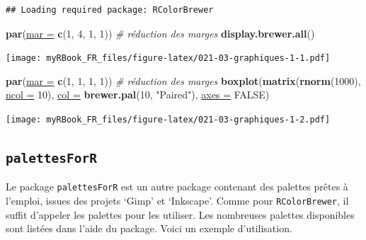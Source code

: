 \documentclass[twoside,symmetric]{book}
\newenvironment{Shaded}{}{}
\newcommand{\CommentTok}[1]{\textit{#1}}
\newcommand{\DataTypeTok}[1]{\underline{#1}}
\newcommand{\DecValTok}[1]{#1}
\newcommand{\KeywordTok}[1]{\textbf{#1}}
\newcommand{\NormalTok}[1]{#1}
\newcommand{\OtherTok}[1]{#1}
\newcommand{\StringTok}[1]{#1}
\begin{document}
\begin{verbatim}
## Loading required package: RColorBrewer
\end{verbatim}

\begin{Shaded}
\begin{Highlighting}[]
\KeywordTok{par}\NormalTok{(}\DataTypeTok{mar =} \KeywordTok{c}\NormalTok{(}\DecValTok{1}\NormalTok{, }\DecValTok{4}\NormalTok{, }\DecValTok{1}\NormalTok{, }\DecValTok{1}\NormalTok{)) }\CommentTok{# réduction des marges}
\KeywordTok{display.brewer.all}\NormalTok{()}
\end{Highlighting}
\end{Shaded}

\texttt{[image: myRBook\_FR\_files/figure-latex/021-03-graphiques-1-1.pdf]}

\begin{Shaded}
\begin{Highlighting}[]
\KeywordTok{par}\NormalTok{(}\DataTypeTok{mar =} \KeywordTok{c}\NormalTok{(}\DecValTok{1}\NormalTok{, }\DecValTok{1}\NormalTok{, }\DecValTok{1}\NormalTok{, }\DecValTok{1}\NormalTok{)) }\CommentTok{# réduction des marges}
\KeywordTok{boxplot}\NormalTok{(}\KeywordTok{matrix}\NormalTok{(}\KeywordTok{rnorm}\NormalTok{(}\DecValTok{1000}\NormalTok{), }\DataTypeTok{ncol =} \DecValTok{10}\NormalTok{), }
  \DataTypeTok{col =} \KeywordTok{brewer.pal}\NormalTok{(}\DecValTok{10}\NormalTok{, }\StringTok{"Paired"}\NormalTok{), }\DataTypeTok{axes =} \OtherTok{FALSE}\NormalTok{)}
\end{Highlighting}
\end{Shaded}

\texttt{[image: myRBook\_FR\_files/figure-latex/021-03-graphiques-1-2.pdf]}

\hypertarget{palettesforr}{%
\subsection{\texorpdfstring{\texttt{palettesForR}}{palettesForR}}\label{palettesforr}}

Le package \texttt{palettesForR} est un autre package contenant des palettes prêtes à l'emploi, issues des projets `Gimp' et `Inkscape'. Comme pour \texttt{RColorBrewer}, il suffit d'appeler les palettes pour les utiliser. Les nombreuses palettes disponibles sont listées dans l'aide du package. Voici un exemple d'utilisation.
\end{document}
